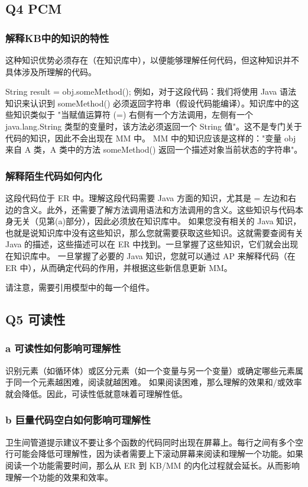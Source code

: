 \subsection{Q4 PCM}
\subsubsection{解释KB中的知识的特性}

这种知识优势必须存在（在知识库中），以便能够理解任何代码，但这种知识并不具体涉及所理解的代码。

String result = obj.someMethod(); 例如，对于这段代码：我们将使用 Java 语法知识来认识到 someMethod() 必须返回字符串（假设代码能编译）。知识库中的这些知识类似于 "当赋值运算符 (=) 右侧有一个方法调用，左侧有一个 java.lang.String 类型的变量时，该方法必须返回一个 String 值"。这不是专门关于代码的知识，因此不会出现在 MM 中。
MM 中的知识应该是这样的："变量 obj 来自 A 类，A 类中的方法 someMethod() 返回一个描述对象当前状态的字符串"。

\subsubsection{解释陌生代码如何内化}
这段代码位于 ER 中。理解这段代码需要 Java 方面的知识，尤其是 = 左边和右边的含义。此外，还需要了解方法调用语法和方法调用的含义。这些知识与代码本身无关（见第(a)部分），因此必须放在知识库中。
如果您没有相关的 Java 知识，也就是说知识库中没有这些知识，那么您就需要获取这些知识。这就需要查阅有关 Java 的描述，这些描述可以在 ER 中找到。一旦掌握了这些知识，它们就会出现在知识库中。
一旦掌握了必要的 Java 知识，您就可以通过 AP 来解释代码（在 ER 中），从而确定代码的作用，并根据这些新信息更新 MM。

请注意，需要引用模型中的每一个组件。

\subsection{Q5 可读性}

\subsubsection{a 可读性如何影响可理解性}
识别元素（如循环体）或区分元素（如一个变量与另一个变量）或确定哪些元素属于同一个元素越困难，阅读就越困难。 如果阅读困难，那么理解的效果和/或效率就会降低。因此，可读性低就意味着可理解性低。

\subsubsection{b 巨量代码空白如何影响可理解性}
卫生间管道提示建议不要让多个函数的代码同时出现在屏幕上。每行之间有多个空行可能会降低可理解性，因为读者需要上下滚动屏幕来阅读和理解一个功能。如果阅读一个功能需要时间，那么从 ER 到 KB/MM 的内化过程就会延长。从而影响理解一个功能的效果和效率。


